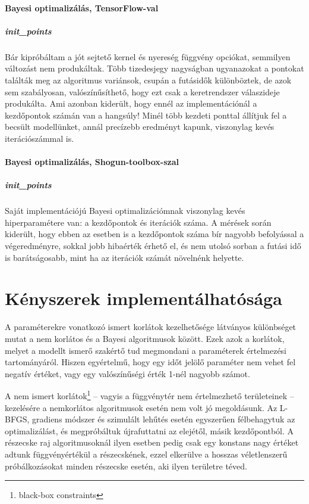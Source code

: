 \paragraph{Bayesi optimalizálás, TensorFlow-val}\subparagraph{init\_points} Bár kipróbáltam a jót sejtető kernel és nyereség függvény opciókat, semmilyen változást nem produkáltak. Több tizedesjegy nagyságban ugyanazokat a pontokat találták meg az algoritmus variánsok, csupán a futásidők különböztek, de azok sem szabályosan, valószínűsíthető, hogy ezt csak a keretrendszer válaszideje produkálta. Ami azonban kiderült, hogy ennél az implementációnál a kezdőpontok számán van a hangsúly! Minél több kezdeti ponttal állítjuk fel a becsült modellünket, annál precízebb eredményt kapunk, viszonylag kevés iterációszámmal is.
\paragraph{Bayesi optimalizálás, Shogun-toolbox-szal}\subparagraph{init\_points} Saját implementációjú Bayesi optimalizációmnak viszonylag kevés hiperparamétere van: a kezdőpontok és iterációk száma. A mérések során kiderült, hogy ebben az esetben is a kezdőpontok száma bír nagyobb befolyással a végeredményre, sokkal jobb hibaérték érhető el, és nem utolsó sorban a futási idő is barátságosabb, mint ha az iterációk számát növelnénk helyette.

\section{Kényszerek implementálhatósága}
A paraméterekre vonatkozó ismert korlátok kezelhetősége látványos különbséget mutat a nem korlátos és a Bayesi algoritmusok között. Ezek azok a korlátok, melyet a modellt ismerő szakértő tud megmondani a paraméterek értelmezési tartományáról. Hiszen egyértelmű, hogy egy időt jelölő paraméter nem vehet fel negatív értéket, vagy egy valószínűségi érték 1-nél nagyobb számot.

A nem ismert korlátok\footnote{black-box constraints} -- vagyis a függvénytér nem értelmezhető területeinek -- kezelésére a nemkorlátos algoritmusok esetén nem volt jó megoldásunk. Az L-BFGS, gradiens módszer és szimulált lehűtés esetén egyszerűen félbehagytuk az optimalizálást, és megpróbáltuk újrafuttatni az elejétől, másik kezdőpontból. A részecske raj algoritmusoknál ilyen esetben pedig csak egy konstans nagy értéket adtunk függvényértékül a részecskének, ezzel elkerülve a hosszas véletlenszerű próbálkozásokat minden részecske esetén, aki ilyen területre téved.

